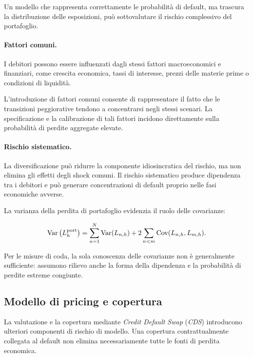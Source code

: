 Un modello che rappresenta correttamente le probabilit\`{a} di default,
ma trascura la distribuzione delle esposizioni, pu\`{o} sottovalutare il
rischio complessivo del portafoglio.

\paragraph{Fattori comuni.}

I debitori possono essere influenzati dagli stessi fattori
macroeconomici e finanziari, come crescita economica, tassi di
interesse, prezzi delle materie prime o condizioni di liquidit\`{a}.

L'introduzione di fattori comuni consente di rappresentare il fatto che
le transizioni peggiorative tendono a concentrarsi negli stessi
scenari. La specificazione e la calibrazione di tali fattori incidono
direttamente sulla probabilit\`{a} di perdite aggregate elevate.

\paragraph{Rischio sistematico.}

La diversificazione pu\`{o} ridurre la componente idiosincratica del
rischio, ma non elimina gli effetti degli shock comuni. Il rischio
sistematico produce dipendenza tra i debitori e pu\`{o} generare
concentrazioni di default proprio nelle fasi economiche avverse.

La varianza della perdita di portafoglio evidenzia il ruolo delle
covarianze:

\[
\operatorname{Var}
\left(
L_h^{\mathrm{port}}
\right)
=
\sum_{n=1}^{N}
\operatorname{Var}(L_{n,h})
+
2
\sum_{n<m}
\operatorname{Cov}(L_{n,h},L_{m,h}).
\]

Per le misure di coda, la sola conoscenza delle covarianze non \`{e}
generalmente sufficiente: assumono rilievo anche la forma della
dipendenza e la probabilit\`{a} di perdite estreme congiunte.

\subsection{Modello di pricing e copertura}

\label{subsec:cap9-limiti-pricing-copertura}

La valutazione e la copertura mediante \emph{Credit Default Swap}
(\emph{CDS}) introducono ulteriori componenti di rischio di modello.
Una copertura contrattualmente collegata al default non elimina
necessariamente tutte le fonti di perdita economica.

